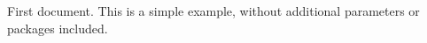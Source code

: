 \documentclass{article}
\begin{document}
First document. This is a simple example, without additional parameters or packages included.
\end{document}
